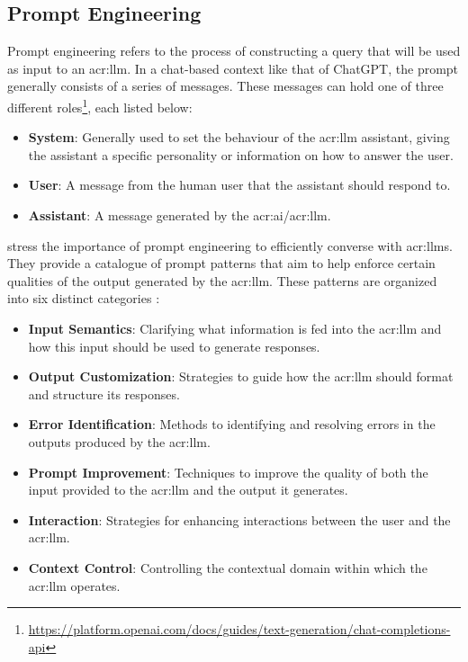 \subsection{Prompt Engineering}
\label{subsec:prompt-engineering}

Prompt engineering refers to the process of constructing a query that will be used as input to an \acrshort{acr:llm}. In a chat-based context like that of ChatGPT, the prompt generally consists of a series of messages. These messages can hold one of three different roles\footnote{\url{https://platform.openai.com/docs/guides/text-generation/chat-completions-api}}, each listed below:

\begin{itemize}
    \item \textbf{System}: Generally used to set the behaviour of the \acrshort{acr:llm} assistant, giving the assistant a specific personality or information on how to answer the user.
    \item \textbf{User}: A message from the human user that the assistant should respond to.
    \item \textbf{Assistant}: A message generated by the \acrshort{acr:ai}/\acrshort{acr:llm}.
\end{itemize}

\cite{whitePromptPatternCatalog2023a} stress the importance of prompt engineering to efficiently converse with \glspl{acr:llm}. They provide a catalogue of prompt patterns that aim to help enforce certain qualities of the output generated by the \gls{acr:llm}. These patterns are organized into six distinct categories \citep[4]{whitePromptPatternCatalog2023a}:

\begin{itemize}
    \item \textbf{Input Semantics}: Clarifying what information is fed into the \acrshort{acr:llm} and how this input should be used to generate responses.
    \item \textbf{Output Customization}: Strategies to guide how the \acrshort{acr:llm} should format and structure its responses.
    \item \textbf{Error Identification}: Methods to identifying and resolving errors in the outputs produced by the \acrshort{acr:llm}.
    \item \textbf{Prompt Improvement}: Techniques to improve the quality of both the input provided to the \acrshort{acr:llm} and the output it generates.
    \item \textbf{Interaction}: Strategies for enhancing interactions between the user and the \acrshort{acr:llm}.
    \item \textbf{Context Control}: Controlling the contextual domain within which the \acrshort{acr:llm} operates.
\end{itemize}

